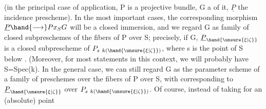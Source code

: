 (in the principal case of application, P is a projective bundle, G a
 of it, $\underline{P}$ the incidence prescheme). In the most
important cases, the corresponding morphism $\underline{P} \hand{\longrightarrow} Px_S G$ will be a closed
immersion, and we regard G as   family of closed
subpreschemes of the fibers of P over S; precisely, if \hand{\unsure{\xi|\zeta}} \hand{$\in$} G,
$\underline{P}_{\hand{\unsure{\xi|\zeta}}}$ is a closed subprescheme of $P_{s\ k(\hand{\unsure{\xi|\zeta}})}$, where s is the point of S
below \hand{\unsure{\xi|\zeta}}. (Moreover, for most statements in this context,
we will probably have S=Spec(k)\hand{)}. In the general case, we can still
regard G as the parameter scheme of a family of preschemes
over the fibers of P over S, with \hand{\unsure{\xi|\zeta}} corresponding to $\underline{P}_{\hand{\unsure{\xi|\zeta}}}$ over
$P_{s\ k(\hand{\unsure{\xi|\zeta}})}$. Of course, instead of taking for \hand{\unsure{\xi|\zeta}} an (absolute) point 

